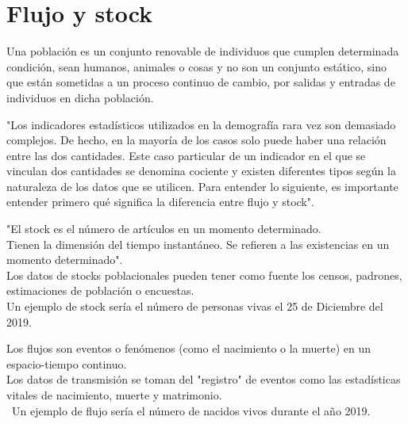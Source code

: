 \section{Flujo y stock}
\begin{Def}
    Una población es un conjunto renovable de individuos que cumplen determinada condición, sean humanos, animales o cosas y no son un conjunto estático, sino que están sometidas a un proceso continuo de cambio, por salidas y entradas de individuos en dicha población.
\end{Def}
"Los indicadores estadísticos utilizados en la demografía rara vez son demasiado complejos. De hecho, en la mayoría de los casos solo puede haber una relación entre las dos cantidades. Este caso particular de un indicador en el que se vinculan dos cantidades se denomina cociente y existen diferentes tipos según la naturaleza de los datos que se utilicen. Para entender lo siguiente, es importante entender primero qué significa la diferencia entre flujo y stock".
\begin{Def}
    "El stock es el número de artículos en un momento determinado. \\
    Tienen la dimensión del tiempo instantáneo. Se refieren a las existencias en un momento determinado". \\
    Los datos de stocks poblacionales pueden tener como fuente los censos, padrones, estimaciones de población o encuestas.\\
    Un ejemplo de stock sería el número de personas vivas el 25 de Diciembre del 2019.
\end{Def}
\begin{Def}
    Los flujos son eventos o fenómenos (como el nacimiento o la muerte) en un espacio-tiempo continuo. \\ Los datos de transmisión se toman del "registro" de eventos como las estadísticas vitales de nacimiento, muerte y matrimonio. \\ \
    Un ejemplo de flujo sería el número de nacidos vivos durante el año 2019.
\end{Def}
